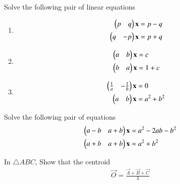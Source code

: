 
\item Solve the following pair of linear equations
%
\begin{enumerate}[itemsep=2pt]
\item
\begin{align}
\begin{split}
\begin{pmatrix}p & q \end{pmatrix}\mathbf{x}&=p-q
\\
\begin{pmatrix}q & -p \end{pmatrix}\mathbf{x}&=p+q
\end{split}
\end{align}
\item
\begin{align}
\begin{split}
\begin{pmatrix}a & b \end{pmatrix}\mathbf{x}&=c
\\
\begin{pmatrix}b & a \end{pmatrix}\mathbf{x}&=1+c
\end{split}
\end{align}
\item
\begin{align}
\begin{split}
\begin{pmatrix}\frac{1}{a} & -\frac{1}{b} \end{pmatrix}\mathbf{x}&=0
\\
\begin{pmatrix}a & b \end{pmatrix}\mathbf{x}&=a^2+b^2
\end{split}
\end{align}
%
\end{enumerate}
%
%
\item Solve the following pair of equations
\begin{align}
\begin{split}
\begin{pmatrix}a-b & a+b \end{pmatrix}\mathbf{x}&=a^2-2ab-b^2
\\
\begin{pmatrix}a+b & a+b \end{pmatrix}\mathbf{x}&=a^2+b^2
\end{split}
\end{align}
%

\item In $\triangle ABC$, Show that the centroid 
\begin{align}
\vec{O} = \frac{\vec{A}+\vec{B}+\vec{C}}{3}
\end{align}
%
%


